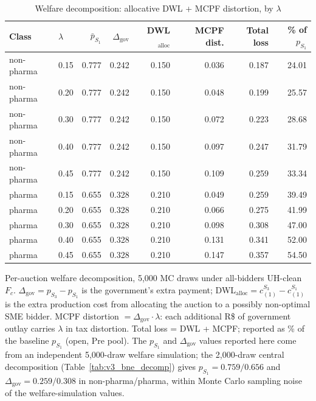 \begin{table}[htbp]
\centering
\begin{threeparttable}
\caption{Welfare decomposition: allocative DWL + MCPF distortion, by $\lambda$}
\label{tab:v3_welfare}
\small
\begin{tabular}{llrrrrrr}
\toprule
Class & $\lambda$ & $\bar p_{S_1}$ & $\Delta_{\text{gov}}$ & DWL$_{\text{alloc}}$ & MCPF dist. & Total loss & \% of $p_{S_1}$ \\
\midrule
non-pharma & 0.15 & 0.777 & 0.242 & 0.150 & 0.036 & 0.187 & 24.01 \\
non-pharma & 0.20 & 0.777 & 0.242 & 0.150 & 0.048 & 0.199 & 25.57 \\
non-pharma & 0.30 & 0.777 & 0.242 & 0.150 & 0.072 & 0.223 & 28.68 \\
non-pharma & 0.40 & 0.777 & 0.242 & 0.150 & 0.097 & 0.247 & 31.79 \\
non-pharma & 0.45 & 0.777 & 0.242 & 0.150 & 0.109 & 0.259 & 33.34 \\
pharma & 0.15 & 0.655 & 0.328 & 0.210 & 0.049 & 0.259 & 39.49 \\
pharma & 0.20 & 0.655 & 0.328 & 0.210 & 0.066 & 0.275 & 41.99 \\
pharma & 0.30 & 0.655 & 0.328 & 0.210 & 0.098 & 0.308 & 47.00 \\
pharma & 0.40 & 0.655 & 0.328 & 0.210 & 0.131 & 0.341 & 52.00 \\
pharma & 0.45 & 0.655 & 0.328 & 0.210 & 0.147 & 0.357 & 54.50 \\
\bottomrule
\end{tabular}
\begin{tablenotes}\footnotesize
\item Per-auction welfare decomposition, 5{,}000 MC draws under
all-bidders UH-clean $F_c$. $\Delta_{\text{gov}} = p_{S_3} -
p_{S_1}$ is the government's extra payment; DWL$_{\text{alloc}}
= c_{(1)}^{S_3} - c_{(1)}^{S_1}$ is the extra production cost
from allocating the auction to a possibly non-optimal SME bidder.
MCPF distortion $= \Delta_{\text{gov}} \cdot \lambda$: each
additional R\$ of government outlay carries $\lambda$ in tax
distortion. Total loss = DWL + MCPF; reported as \% of the
baseline $p_{S_1}$ (open, Pre pool). The $p_{S_1}$ and
$\Delta_{\text{gov}}$ values reported here come from an
independent 5{,}000-draw welfare simulation; the 2{,}000-draw
central decomposition (Table~\ref{tab:v3_bne_decomp}) gives
$p_{S_1} = 0.759 / 0.656$ and $\Delta_{\text{gov}} = 0.259 / 0.308$
in non-pharma/pharma, within Monte Carlo sampling noise of the
welfare-simulation values.
\end{tablenotes}
\end{threeparttable}
\end{table}
